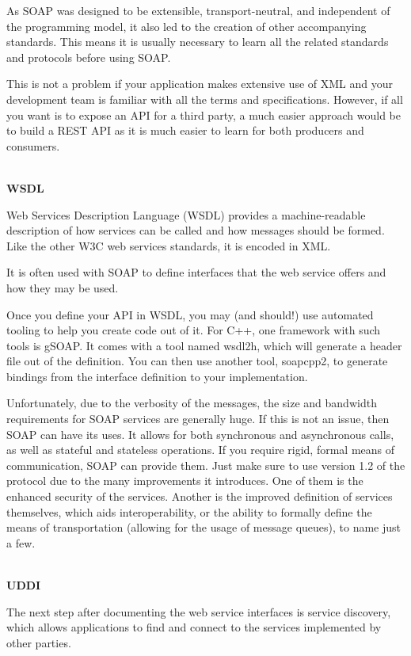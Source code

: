 As SOAP was designed to be extensible, transport-neutral, and independent of the programming model, it also led to the creation of other accompanying standards. This means it is usually necessary to learn all the related standards and protocols before using SOAP.

This is not a problem if your application makes extensive use of XML and your development team is familiar with all the terms and specifications. However, if all you want is to expose an API for a third party, a much easier approach would be to build a REST API as it is much easier to learn for both producers and consumers.

\hspace*{\fill} \\ %
\noindent
\textbf{WSDL}

Web Services Description Language (WSDL) provides a machine-readable description of how services can be called and how messages should be formed. Like the other W3C web services standards, it is encoded in XML.

It is often used with SOAP to define interfaces that the web service offers and how they may be used.

Once you define your API in WSDL, you may (and should!) use automated tooling to help you create code out of it. For C++, one framework with such tools is gSOAP. It comes with a tool named wsdl2h, which will generate a header file out of the definition. You can then use another tool, soapcpp2, to generate bindings from the interface definition to your implementation.

Unfortunately, due to the verbosity of the messages, the size and bandwidth requirements for SOAP services are generally huge. If this is not an issue, then SOAP can have its uses. It allows for both synchronous and asynchronous calls, as well as stateful and stateless operations. If you require rigid, formal means of communication, SOAP can provide them. Just make sure to use version 1.2 of the protocol due to the many improvements it introduces. One of them is the enhanced security of the services. Another is the improved definition of services themselves, which aids interoperability, or the ability to formally define the means of transportation (allowing for the usage of message queues), to name just a few.

\hspace*{\fill} \\ %
\noindent
\textbf{UDDI}

The next step after documenting the web service interfaces is service discovery, which allows applications to find and connect to the services implemented by other parties.

